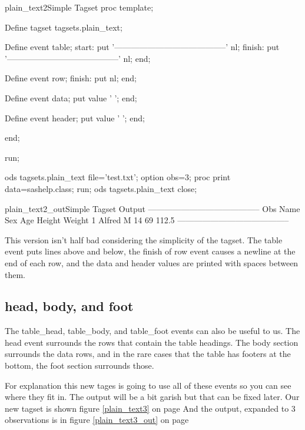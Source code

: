 \begin{fvcode}{plain_text2}{Simple Tagset}
 proc template;

     Define tagset tagsets.plain_text;

         Define event table;
             start:
                 put '-----------------------------------------' nl;
             finish:
                 put '-----------------------------------------' nl;
         end;

         Define event row;
             finish:
                 put nl;
         end;

         Define event data;
             put value '   ';
         end;

         Define event header;
             put value ' ';
         end;


     end; 

 run;

     
 ods tagsets.plain_text file='test.txt';
 option obs=3;
 proc print data=sashelp.class; run;
 ods tagsets.plain_text close;
\end{fvcode}

\begin{poutput}{plain_text2_out}{Simple Tagset Output}
-----------------------------------------
Obs Name Sex Age Height Weight 
 1 Alfred   M   14   69   112.5   
-----------------------------------------
\end{poutput}

This version isn't half bad considering the simplicity of the
tagset.  The table event puts lines above and below,  the finish 
of row event causes a newline at the end of each row, and the data
and header values are printed with spaces between them.

\subsection{head, body, and foot}
The table\_head, table\_body, and table\_foot events can also be useful 
to us. The head event surrounds the rows that contain the table
headings.  The body section surrounds the data rows, and in the
rare cases that the table has footers at the bottom, the foot section
surrounds those.

For explanation this new tages is going to use all of these events so you can see
where they fit in.  The output will be a bit garish but that can be fixed later.
Our new tagset is shown figure \ref{plain_text3} on page \pageref{plain_text3} 
And the output, expanded to 3 observations is in figure \ref{plain_text3_out} 
on page \pageref{plain_text3_out} 


